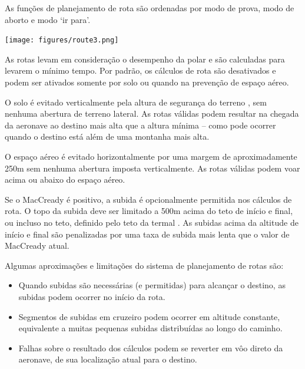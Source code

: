 As funções de planejamento de rota são ordenadas por modo de prova, modo de aborto e modo ‘ir para’.

\begin{center}
\texttt{[image: figures/route3.png]}
\end{center}

As rotas levam em consideração o desempenho da polar e são calculadas para levarem o mínimo tempo.  Por padrão, os cálculos de rota são desativados e podem ser ativados somente por solo ou quando na prevenção de espaço aéreo. 

O solo é evitado verticalmente pela altura de segurança do terreno , sem nenhuma abertura de terreno lateral.  As rotas válidas podem  resultar na chegada da aeronave ao destino mais alta que a altura mínima – como pode ocorrer quando o destino está além de uma montanha mais alta.

O espaço aéreo é evitado horizontalmente por uma margem de aproximadamente 250m sem nenhuma abertura imposta verticalmente.  As rotas válidas podem voar acima ou abaixo do espaço aéreo.

Se o MacCready é positivo, a subida é opcionalmente permitida nos cálculos de rota.  O topo da subida deve ser limitado a 500m acima do teto de início e final, ou incluso no teto, definido pelo teto da termal .  As subidas acima da altitude de início e final são penalizadas por uma taxa de subida mais lenta que o valor de MacCready atual.

Algumas aproximações e limitações do sistema de planejamento de rotas são:
\begin{itemize}
\item Quando subidas são necessárias (e permitidas) para alcançar o destino, as subidas podem ocorrer no início da rota. 
\item Segmentos de subidas em cruzeiro podem ocorrer em altitude constante, equivalente a muitas pequenas subidas distribuídas ao longo do caminho. 
\item Falhas sobre o resultado dos cálculos podem se reverter em vôo direto da aeronave, de sua localização atual para o destino.
\end{itemize}

